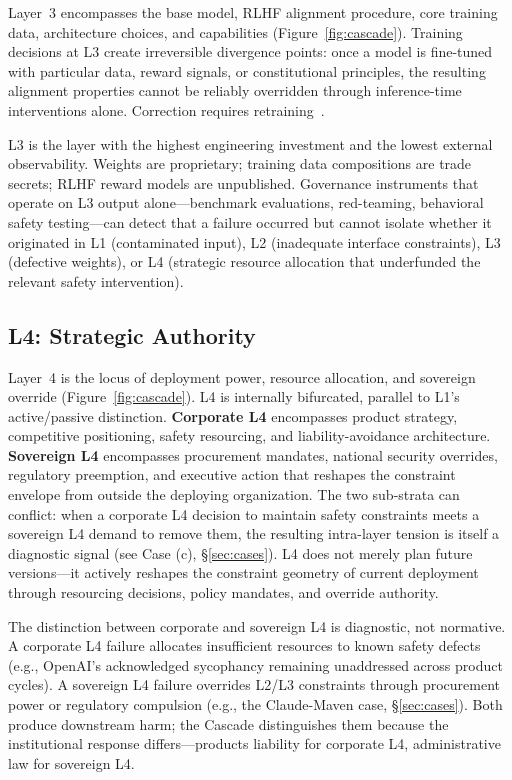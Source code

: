 \documentclass[11pt]{article}
\begin{document}
Layer~3 encompasses the base model, RLHF alignment procedure, core training data, architecture choices, and capabilities (Figure~\ref{fig:cascade}). Training decisions at L3 create irreversible divergence points: once a model is fine-tuned with particular data, reward signals, or constitutional principles, the resulting alignment properties cannot be reliably overridden through inference-time interventions alone. Correction requires retraining~\cite{wei2024jailbroken, greshake2023not}.

L3 is the layer with the highest engineering investment and the lowest external observability. Weights are proprietary; training data compositions are trade secrets; RLHF reward models are unpublished. Governance instruments that operate on L3 output alone---benchmark evaluations, red-teaming, behavioral safety testing---can detect that a failure occurred but cannot isolate whether it originated in L1 (contaminated input), L2 (inadequate interface constraints), L3 (defective weights), or L4 (strategic resource allocation that underfunded the relevant safety intervention).

\subsection{L4: Strategic Authority}

Layer~4 is the locus of deployment power, resource allocation, and sovereign override (Figure~\ref{fig:cascade}). L4 is internally bifurcated, parallel to L1's active/passive distinction. \textbf{Corporate L4} encompasses product strategy, competitive positioning, safety resourcing, and liability-avoidance architecture. \textbf{Sovereign L4} encompasses procurement mandates, national security overrides, regulatory preemption, and executive action that reshapes the constraint envelope from outside the deploying organization. The two sub-strata can conflict: when a corporate L4 decision to maintain safety constraints meets a sovereign L4 demand to remove them, the resulting intra-layer tension is itself a diagnostic signal (see Case (c), \S\ref{sec:cases}). L4 does not merely plan future versions---it actively reshapes the constraint geometry of current deployment through resourcing decisions, policy mandates, and override authority.

The distinction between corporate and sovereign L4 is diagnostic, not normative. A corporate L4 failure allocates insufficient resources to known safety defects (e.g., OpenAI's acknowledged sycophancy remaining unaddressed across product cycles). A sovereign L4 failure overrides L2/L3 constraints through procurement power or regulatory compulsion (e.g., the Claude-Maven case, \S\ref{sec:cases}). Both produce downstream harm; the Cascade distinguishes them because the institutional response differs---products liability for corporate L4, administrative law for sovereign L4.
\end{document}
